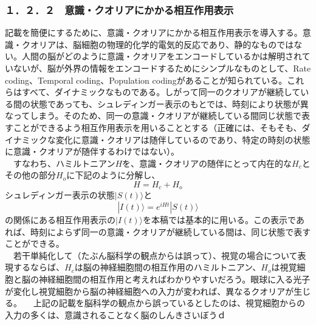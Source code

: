 \subsubsection{１．２．２　意識・クオリアにかかる相互作用表示}
記載を簡便にするために、意識・クオリアにかかる相互作用表示を導入する。意識・クオリアは、脳細胞の物理的化学的電気的反応であり、静的なものではない。人間の脳がどのように意識・クオリアをエンコードしているかは解明されていないが、脳が外界の情報をエンコードするためにシンプルなものとして、Rate coding、Temporal coding、Population codingがあることが知られている\cite{wikipediac}。これらはすべて、ダイナミックなものである。しがって同一のクオリアが継続している間の状態であっても、シュレディンガー表示のもとでは、時刻により状態が異なってしまう。そのため、同一の意識・クオリアが継続している間同じ状態で表すことができるよう相互作用表示を用いることとする（正確には、そもそも、ダイナミックな変化に意識・クオリアは随伴しているのであり、特定の時刻の状態に意識・クオリアが随伴するわけではない）。\\
　すなわち、ハミルトニアン$H$を、意識・クオリアの随伴にとって内在的な$H_c$とその他の部分$H_o$に下記のように分解し、
　\begin{equation}
  H=H_c + H_o
\end{equation}
シュレディンガー表示の状態$|S(t)\rangle$と
　\begin{equation}
  |I(t)\rangle = e^{iHt}|S(t)\rangle
\end{equation}
の関係にある相互作用表示の$|I(t)\rangle$を本稿では基本的に用いる。この表示であれば、時刻によらず同一の意識・クオリアが継続している間は、同じ状態で表すことができる。\\
　若干単純化して（たぶん脳科学の観点からは誤って）、視覚の場合について表現するならば、$H_c$は脳の神経細胞間の相互作用のハミルトニアン、$H_o$は視覚細胞と脳の神経細胞間の相互作用と考えればわかりやすいだろう。眼球に入る光子が変化し視覚細胞から脳の神経細胞への入力が変われば、異なるクオリアが生じる。
　上記の記載を脳科学の観点から誤っているとしたのは、視覚細胞からの入力の多くは、意識されることなく脳のしんきさいぼうｄ